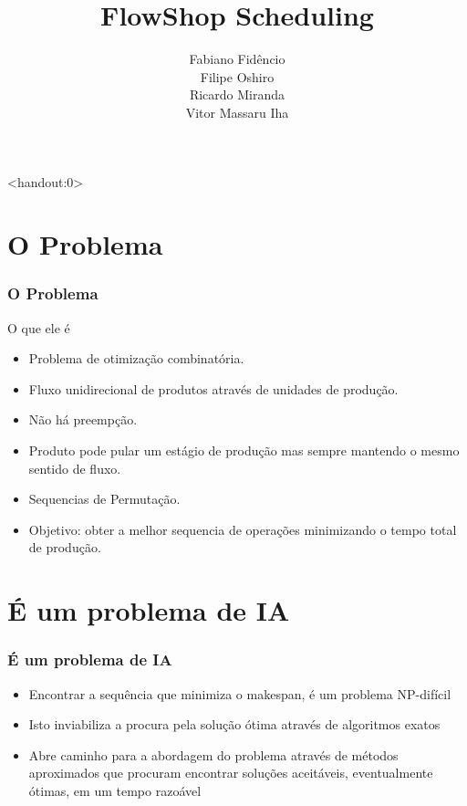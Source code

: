 \documentclass[12pt]{beamer}
\title{FlowShop Scheduling}
\author[Fidêncio,Oshiro,Miranda,Iha]{Fabiano Fidêncio\\ Filipe Oshiro\\ Ricardo Miranda\\ Vitor Massaru Iha}
\institute[IC-UNICAMP]{Instituto de Computação - UNICAMP}
\begin{document}
\begin{frame}<handout:0>
	\titlepage 
\end{frame}


\section{O Problema}
\begin{frame}
	\frametitle{O Problema}
	\begin{block}{O que ele é}
		\begin{itemize}
			\item Problema de otimização combinatória.	\pause
			\item Fluxo unidirecional de produtos através de unidades de produção. 	\pause
			\item Não há preempção.	\pause
			\item Produto pode pular um estágio de produção mas sempre mantendo o mesmo sentido de fluxo. \pause
			\item Sequencias de Permutação.	\pause
			\item Objetivo: obter a melhor sequencia de operações minimizando o tempo total de produção. \pause

		\end{itemize}
	\end{block}
\end{frame}

\section{É um problema de IA}
\begin{frame}
        \frametitle{É um problema de IA}
        \begin{block}{}
                \begin{itemize}
                        \item Encontrar a sequência que minimiza o makespan, é um problema NP-difícil   \pause
                        \item Isto inviabiliza a procura pela solução ótima através de algoritmos exatos   \pause
                        \item Abre caminho para a abordagem do problema através de métodos aproximados que procuram encontrar soluções aceitáveis, eventualmente ótimas, em um tempo razoável  \pause
                \end{itemize}
        \end{block}
\end{frame}
\end{document}
